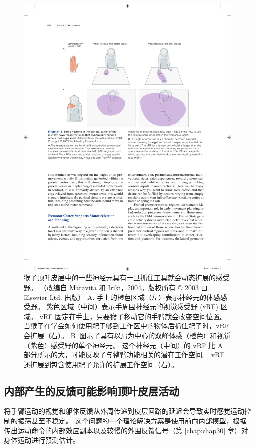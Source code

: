 \begin{figure}[htbp]
	\centering
	\includegraphics[width=0.8\linewidth]{chap34/fig_34_6}
	\caption{猴子顶叶皮层中的一些神经元具有一旦抓住工具就会动态扩展的感受野。 （改编自 Maravita 和 Iriki，2004。版权所有 © 2003 由 Elsevier Ltd. 出版） A. 手上的橙色区域（左）表示神经元的体感感受野。 紫色区域（中间）表示手周围神经元的视觉感受野 (vRF) 区域。 vRF 固定在手上，只要猴子移动它的手臂就会改变空间位置。 当猴子在学会如何使用耙子够到工作区中的物体后抓住耙子时，vRF 会扩展（右）。 B. 图示了具有以肩为中心的双峰体感（橙色）和视觉（紫色）感受野的单个神经元。 这个神经元（中间）的 vRF 比 A 部分所示的大，可能反映了与整臂功能相关的潜在工作空间。 vRF 还扩展到包含使用耙子允许的扩展工作空间（右）。}
	\label{fig:34_6}
\end{figure}


\subsection{内部产生的反馈可能影响顶叶皮层活动}

将手臂运动的视觉和躯体反馈从外周传递到皮层回路的延迟会导致实时感觉运动控制的振荡甚至不稳定。
这个问题的一个理论解决方案是使用前向内部模型，根据传出运动命令的内部效应副本以及较慢的外围反馈信号（第 \ref{chap:chap30} 章）对身体运动进行预测估计。


